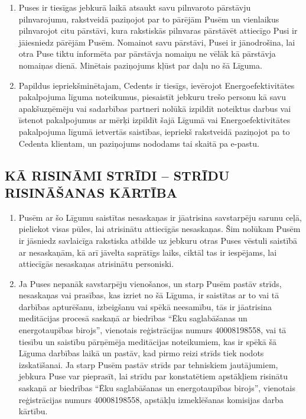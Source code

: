 \documentclass[a4paper]{article}
\begin{document}
\begin{multicols}{2}
\begin{enumerate}
  \item{Puses ir tiesīgas jebkurā laikā atsaukt savu pilnvaroto pārstāvju
pilnvarojumu, rakstveidā paziņojot par to pārējām Pusēm un
vienlaikus pilnvarojot citu pārstāvi, kura rakstiskās pilnvaras
pārstāvēt attiecīgo Pusi ir jāiesniedz pārējām Pusēm. Nomainot savu
pārstāvi, Pusei ir jānodrošina, lai otra Puse tiktu informēta par
pārstāvja nomaiņu ne vēlāk kā pārstāvja nomaiņas dienā. Minētais
paziņojums kļūst par daļu no šā Līguma.}

  \item{Papildus iepriekšminētajam, Cedents ir tiesīgs, ievērojot
Energoefektivitātes pakalpojuma līguma noteikumus, piesaistīt
jebkuru trešo personu kā savu apakšuzņēmēju vai sadarbības
partneri nolūkā izpildīt noteiktus darbus vai īstenot pakalpojumus ar
mērķi izpildīt šajā Līgumā vai Energoefektivitātes pakalpojuma
līgumā ietvertās saistības, iepriekš rakstveidā paziņojot pa to
Cedenta klientam, un paziņojums nododams tai skaitā pa e{-}pastu.}
  \end{enumerate}

  \subsection{KĀ RISINĀMI STRĪDI – STRĪDU RISINĀŠANAS KĀRTĪBA}

  \begin{enumerate}
  \item{Pusēm ar šo Līgumu saistītas nesaskaņas ir jāatrisina savstarpēju
sarunu ceļā, pieliekot visas pūles, lai atrisinātu attiecīgās nesaskaņas.
Šim nolūkam Pusēm ir jāsniedz savlaicīga rakstiska atbilde uz jebkuru
otras Puses vēstuli saistībā ar nesaskaņām, kā arī jāvelta saprātīgs
laiks, ciktāl tas ir iespējams, lai attiecīgās nesaskaņas atrisinātu
personiski.}

  \item{Ja Puses nepanāk savstarpēju vienošanos, un starp Pusēm pastāv
strīds, nesaskaņas vai prasības, kas izriet no šā Līguma, ir saistītas ar
to vai tā darbības apturēšanu, izbeigšanu vai spēkā neesamību, tās ir
jāatrisina meditācijas procesā saskaņā ar biedrības “Ēku
saglabāšanas un energotaupības birojs”, vienotais reģistrācijas
numurs 40008198558, vai tā tiesību un saistību pārņēmēja
meditācijas noteikumiem, kas ir spēkā šā Līguma darbības laikā un
pastāv, kad pirmo reizi strīds tiek nodots izskatīšanai. Ja starp Pusēm
pastāv strīds par tehniskiem jautājumiem, jebkura Puse var pieprasīt,
lai strīdu par konstatētiem apstākļiem risinātu saskaņā ar biedrības
“Ēku saglabāšanas un energotaupības birojs”, vienotais reģistrācijas
numurs 40008198558, apstākļu izmeklēšanas komisijas darba
kārtību.}


\end{enumerate}
\end{multicols}
\end{document}
